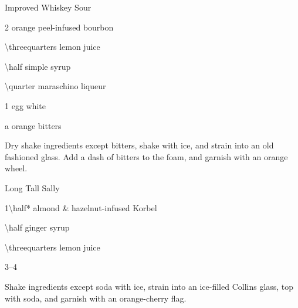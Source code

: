 \begin{Cocktail*}{Improved Whiskey Sour}  %
  \begin{Ingredients}
  \item \SI{2}{\oz} orange peel-infused bourbon
  \item \SI{\threequarters}{\oz} lemon juice
  \item \SI{\half}{\oz} simple syrup
  \item \SI{\quarter}{\oz} maraschino liqueur %
  \item 1 egg white
  \item a \si{\dash} orange bitters
  \end{Ingredients}
  
  \begin{Instructions}
	Dry shake ingredients except bitters, shake with ice, and strain into an old fashioned glass.  Add a dash of bitters to the foam, and garnish with an orange wheel.
  \end{Instructions}
\end{Cocktail*}

\begin{Cocktail*}{Long Tall Sally} %
  \begin{Ingredients}
  \item \SI{1\half*}{\oz} almond \& hazelnut-infused Korbel \vsop
  \item \SI{\half}{\oz} ginger syrup
  \item \SI{\threequarters}{\oz} lemon juice
  \item \SIrange{3}{4}{\oz} \soda
  \end{Ingredients}
  
  \begin{Instructions}
	Shake ingredients except soda with ice, strain into an ice-filled Collins glass, top with soda, and garnish with an orange-cherry flag.
  \end{Instructions}
\end{Cocktail*}

